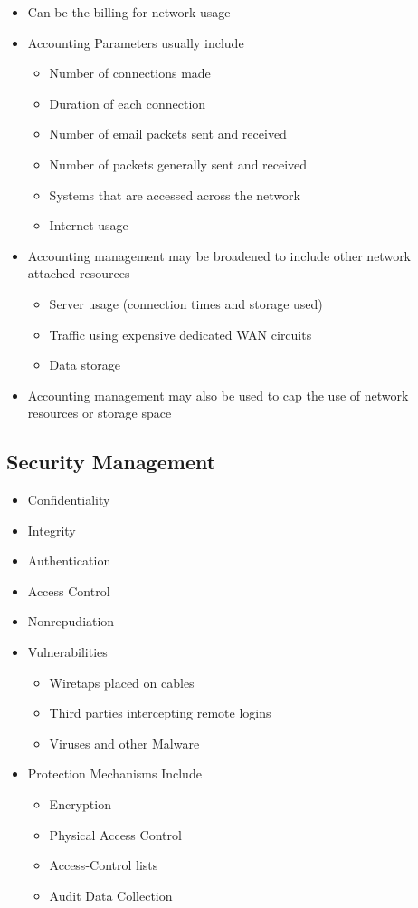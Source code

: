 \begin{itemize}
  \item Can be the billing for network usage
  \item Accounting Parameters usually include
  \begin{itemize}
    \item Number of connections made
    \item Duration of each connection
    \item Number of email packets sent and received
    \item Number of packets generally sent and received
    \item Systems that are accessed across the network
    \item Internet usage
  \end{itemize}
  \item Accounting management may be broadened to include other network attached resources
  \begin{itemize}
    \item Server usage (connection times and storage used)
    \item Traffic using expensive dedicated WAN circuits
    \item Data storage
  \end{itemize}
  \item Accounting management may also be used to cap the use of network resources or storage space
\end{itemize}

\subsection*{Security Management}

\begin{itemize}
  \item Confidentiality
  \item Integrity
  \item Authentication
  \item Access Control
  \item Nonrepudiation
  \item Vulnerabilities
  \begin{itemize}
    \item Wiretaps placed on cables
    \item Third parties intercepting remote logins
    \item Viruses and other Malware
  \end{itemize}
  \item Protection Mechanisms Include
  \begin{itemize}
    \item Encryption
    \item Physical Access Control
    \item Access-Control lists
    \item Audit Data Collection
  \end{itemize}
\end{itemize}